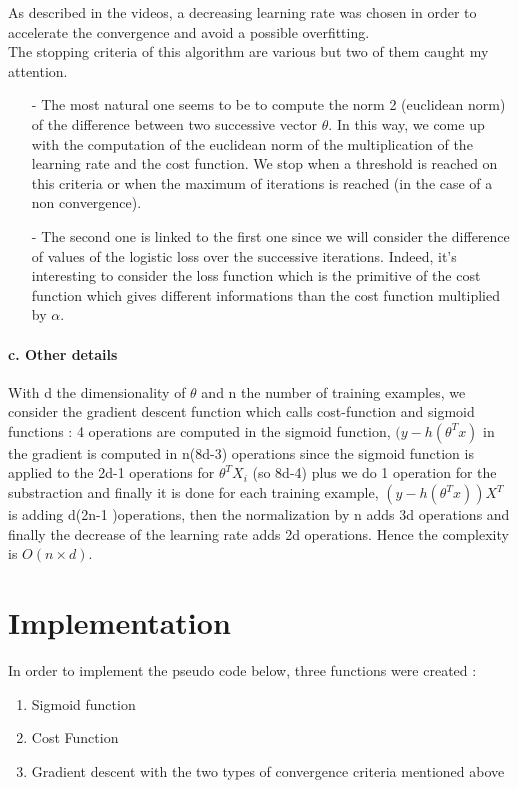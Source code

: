 \documentclass[a4paper,11pt]{article}
\begin{document}
As described in the videos, a decreasing learning rate was chosen in order to accelerate the convergence and avoid a possible overfitting.\\
The stopping criteria of this algorithm are various but two of them caught my attention. 
\begin{itemize}
	\item[-] The most natural one seems to be to compute the norm 2 (euclidean norm) of the difference between two successive vector $\theta$. In this way, we come up with the computation of the euclidean norm of the multiplication of the learning rate and the cost function. We stop when a threshold is reached on this criteria or when the maximum of iterations is reached (in the case of a non convergence).
	\item[-] The second one is linked to the first one since we will consider the difference of values of the logistic loss over the successive iterations. Indeed, it's interesting to consider the loss function which is the primitive of the cost function which gives different informations than the cost function multiplied by $\alpha$.
\end{itemize}

\paragraph*{c. Other details}

With d the dimensionality of $\theta$ and n the number of training examples, we consider the gradient descent function which calls cost-function and sigmoid functions : 4 operations are computed in the sigmoid function, $(y - h(\theta^{T}x)$ in the gradient is computed in n(8d-3) operations since the sigmoid function is applied to the 2d-1 operations for $\theta^T X_i$ (so 8d-4) plus we do 1 operation for the substraction and finally it is done for each training example, $(y - h(\theta^{T}x))X^{T}$ is adding d(2n-1 )operations, then the normalization by n adds 3d operations and finally the decrease of the learning rate adds 2d operations.
Hence the complexity is $O(n\times d)$.

\section{Implementation}

In order to implement the pseudo code below, three functions were created : 
\begin{enumerate}
\item  Sigmoid function
\item  Cost Function
\item  Gradient descent with the two types of convergence criteria mentioned above
\end{enumerate}
\end{document}
